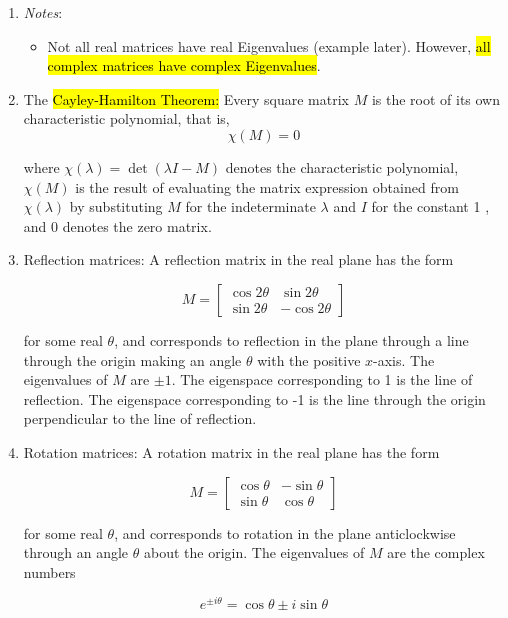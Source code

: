 \documentclass{article}
\begin{document}
\begin{enumerate}
    \item \textit{Notes}:
        \begin{itemize}
            \item Not all real matrices have real Eigenvalues (example later). However, \hl{all complex matrices have complex Eigenvalues}.
        \end{itemize}

    \item The \hl{Cayley-Hamilton Theorem:} Every square matrix $M$ is the root of its own characteristic polynomial, that is,
    $$
    \chi(M)=0
    $$

    where $\chi(\lambda)=\operatorname{det}(\lambda I-M)$ denotes the characteristic polynomial, $\chi(M)$ is the result of evaluating the matrix expression obtained from $\chi(\lambda)$ by substituting $M$ for the indeterminate $\lambda$ and $I$ for the constant 1 , and 0 denotes the zero matrix.\\

    \item Reflection matrices: A reflection matrix in the real plane has the form

    $$
    M=\left[\begin{array}{rr}
    \cos 2 \theta & \sin 2 \theta \\
    \sin 2 \theta & -\cos 2 \theta
    \end{array}\right]
    $$

    for some real $\theta$, and corresponds to reflection in the plane through a line through the origin making an angle $\theta$ with the positive $x$-axis. The eigenvalues of $M$ are $\pm 1$. The eigenspace corresponding to 1 is the line of reflection. The eigenspace corresponding to -1 is the line through the origin perpendicular to the line of reflection.

    \item Rotation matrices: A rotation matrix in the real plane has the form

    $$
    M=\left[\begin{array}{rr}
    \cos \theta & -\sin \theta \\
    \sin \theta & \cos \theta
    \end{array}\right]
    $$

    for some real $\theta$, and corresponds to rotation in the plane anticlockwise through an angle $\theta$ about the origin. The eigenvalues of $M$ are the complex numbers

    $$
    e^{\pm i \theta}=\cos \theta \pm i \sin \theta
    $$


\end{enumerate}
\end{document}
